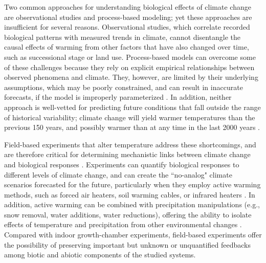 \documentclass{article}
\begin{document}
\par Two common approaches for understanding biological effects of climate change are observational studies and process-based modeling; yet these approaches are insufficient for several reasons. Observational studies, which correlate recorded biological patterns with measured trends in climate, cannot disentangle the causal effects of warming from other factors that have also changed over time, such as successional stage or land use. Process-based models can overcome some of these challenges because they rely on explicit empirical relationships between observed phenomena and climate. They, however, are limited by their underlying assumptions, which may be poorly constrained, and can result in inaccurate forecasts, if the model is improperly parameterized \citep [e.g.,][]{pearson2004,hampe2004,ibanez2006,swab2012,chuine2016}. In addition, neither approach is well-vetted for predicting future conditions that fall outside the range of historical variability; climate change will yield warmer temperatures than the previous 150 years, and possibly warmer than at any time in the last 2000 years \citep{ohlemuller2006,williams2007,williams2007b,ipcc2013}.  

\par Field-based experiments that alter temperature address these shortcomings, and are therefore critical for determining mechanistic links between climate change and biological responses \citep[e.g.,][]{box1978,williams2007,gelman2014}. Experiments can quantify biological responses to different levels of climate change, and can create the ``no-analog" climate scenarios forecasted for the future, particularly when they employ active warming methods, such as forced air heaters, soil warming cables, or infrared heaters \citep{shaver2000,williams2007b,aronson2009}. In addition, active warming can be combined with precipitation manipulations (e.g., snow removal, water additions, water reductions), offering the ability to isolate effects of temperature and precipitation from other environmental changes \citep [e.g.,][]{price1998,cleland2006,sherry2007,rollinson2012}. %
Compared with indoor growth-chamber experiments, field-based experiments offer the possibility of preserving important but unknown or unquantified feedbacks among biotic and abiotic components of the studied systems. 
\end{document}
